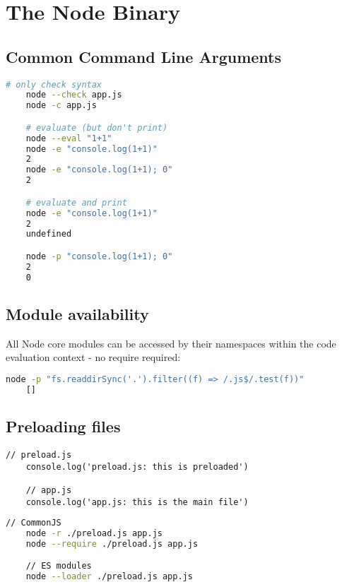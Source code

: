 \documentclass{scrartcl}
\begin{document}



\section{The Node Binary}
\subsection{Common Command Line Arguments}

    \begin{lstlisting}[language=bash]
    # only check syntax
    node --check app.js
    node -c app.js

    # evaluate (but don't print)
    node --eval "1+1"
    node -e "console.log(1+1)"
    2
    node -e "console.log(1+1); 0"
    2

    # evaluate and print
    node -e "console.log(1+1)"
    2
    undefined

    node -p "console.log(1+1); 0"
    2
    0
    \end{lstlisting}


\subsection{Module availability}

    All Node core modules can be accessed by their namespaces within the code evaluation context - no require required:

    \begin{lstlisting}[language=bash]
    node -p "fs.readdirSync('.').filter((f) => /.js$/.test(f))"
    []
    \end{lstlisting}

\subsection{Preloading files}

    \begin{lstlisting}[style=ES6]
    // preload.js
    console.log('preload.js: this is preloaded')

    // app.js
    console.log('app.js: this is the main file')
    \end{lstlisting}

    \begin{lstlisting}[language=bash]
    // CommonJS
    node -r ./preload.js app.js
    node --require ./preload.js app.js

    // ES modules
    node --loader ./preload.js app.js
    \end{lstlisting}
\end{document}
